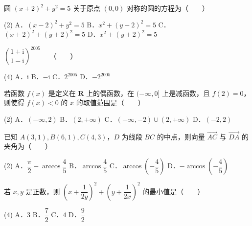 

\begin{question}
圆 $(x + 2)^2 + y^2 = 5$ 关于原点 $(0, 0)$ 对称的圆的方程为\mbox{（　　）}

\begin{gkopts}(2)
\task A．$(x - 2)^2 + y^2 = 5$
\task B．$x^2 + (y - 2)^2 = 5$
\task C．$(x + 2)^2 + (y + 2)^2 = 5$
\task D．$x^2 + (y + 2)^2 = 5$
\end{gkopts}

\end{question}
\begin{question}
$\left(\dfrac{1 + \mathrm{i}}{1 - \mathrm{i}}\right)^{2005} =$\mbox{（　　）}

\begin{gkopts}(4)
\task A．$\mathrm{i}$
\task B．$-\mathrm{i}$
\task C．$2^{2005}$
\task D．$-2^{2005}$
\end{gkopts}

\end{question}
\begin{question}
若函数 $f(x)$ 是定义在 $\mathbf{R}$ 上的偶函数，在 $(-\infty, 0]$ 上是减函数，且 $f(2) = 0$，则使得 $f(x) < 0$ 的 $x$ 的取值范围是\mbox{（　　）}

\begin{gkopts}(2)
\task A．$(-\infty, 2)$
\task B．$(2, +\infty)$
\task C．$(-\infty, -2) \cup (2, +\infty)$
\task D．$(-2, 2)$
\end{gkopts}

\end{question}
\begin{question}
已知 $A(3, 1), B(6, 1), C(4, 3)$，$D$ 为线段 $BC$ 的中点，则向量 $\overrightarrow{AC}$ 与 $\overrightarrow{DA}$ 的夹角为\mbox{（　　）}

\begin{gkopts}(2)
\task A．$\dfrac{\pi}{2} - \arccos\dfrac{4}{5}$
\task B．$\arccos\dfrac{4}{5}$
\task C．$\arccos\left(-\dfrac{4}{5}\right)$
\task D．$-\arccos\left(-\dfrac{4}{5}\right)$
\end{gkopts}

\end{question}
\begin{question}
若 $x, y$ 是正数，则 $\left(x + \dfrac{1}{2y}\right)^2 + \left(y + \dfrac{1}{2x}\right)^2$ 的最小值是\mbox{（　　）}

\begin{gkopts}(4)
\task A．$3$
\task B．$\dfrac{7}{2}$
\task C．$4$
\task D．$\dfrac{9}{2}$
\end{gkopts}

\end{question}
